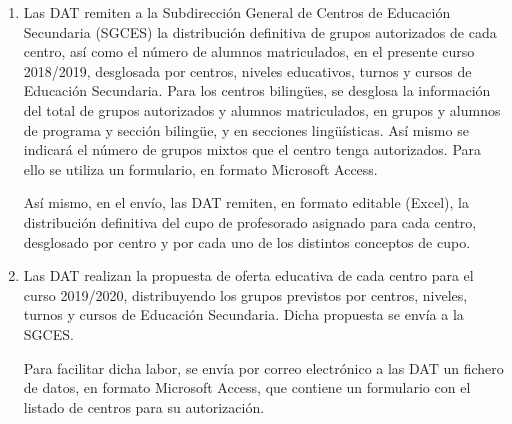 \begin{enumerate}
	\item Las DAT remiten a la Subdirección General de Centros de Educación Secundaria (SGCES) la distribución definitiva de grupos autorizados de cada centro, así como el número de alumnos matriculados, en el presente curso 2018/2019, desglosada por centros, niveles educativos, turnos y cursos de Educación Secundaria. Para los centros bilingües, se desglosa la información del total de grupos autorizados y alumnos matriculados, en grupos y alumnos de programa y sección bilingüe, y en secciones lingüísticas. Así mismo se indicará el número de grupos mixtos que el centro tenga autorizados. Para ello se utiliza un formulario, en formato Microsoft Access. 
	
	Así  mismo, en el envío,  las DAT  remiten,  en formato editable (Excel), la distribución definitiva del cupo de profesorado asignado para cada centro, desglosado por centro y por cada uno de los distintos conceptos de cupo.
	\item Las DAT realizan la propuesta de oferta educativa de cada centro para el curso 2019/2020, distribuyendo los grupos previstos por centros, niveles, turnos y cursos de Educación Secundaria. Dicha propuesta se envía a la SGCES.
	
	Para facilitar dicha labor, se envía por correo electrónico a las DAT un fichero de datos, en formato Microsoft  Access, que contiene un formulario con el listado de centros para su autorización.
	

\end{enumerate}
